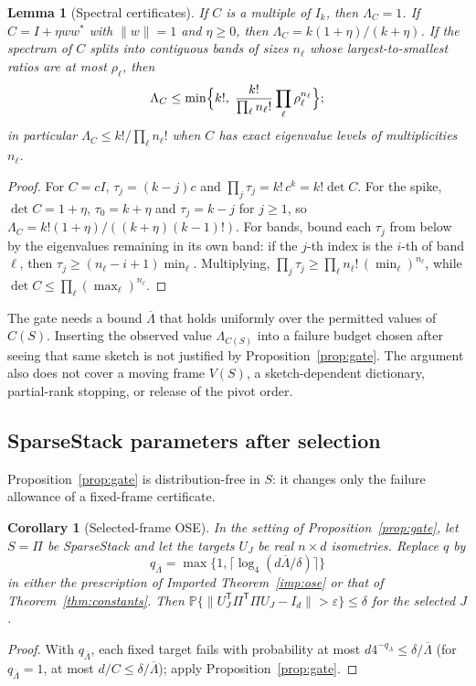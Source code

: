 \documentclass[11pt,a4paper]{article}
\newtheorem{lemma}[theorem]{Lemma}
\newtheorem{corollary}[theorem]{Corollary}
\theoremstyle{definition}
\theoremstyle{remark}
\newcommand{\Prob}{\mathbb P}
\newcommand{\eps}{\varepsilon}
\newcommand{\norm}[1]{\lVert#1\rVert}
\newcommand{\1}{\mathbf 1}
\newcommand{\T}{\mathsf T}
\newcommand{\Lbar}{\overline\Lambda}
\begin{document}
\begin{lemma}[Spectral certificates]\label{lem:bands}
If $C$ is a multiple of $I_k$, then $\Lambda_C=1$. If $C=I+\eta ww^*$
with $\norm w=1$ and $\eta\ge0$, then $\Lambda_C=k(1+\eta)/(k+\eta)$. If
the spectrum of $C$ splits into contiguous bands of sizes $n_\ell$ whose
largest-to-smallest ratios are at most $\rho_\ell$, then
\[
 \Lambda_C\le\min\Bigl\{k!,\;\frac{k!}{\prod_\ell n_\ell!}\prod_\ell\rho_\ell^{n_\ell}\Bigr\};
\]
in particular $\Lambda_C\le k!/\prod_\ell n_\ell!$ when $C$ has exact
eigenvalue levels of multiplicities $n_\ell$.
\end{lemma}
\begin{proof}
For $C=cI$, $\tau_j=(k-j)c$ and $\prod_j\tau_j=k!\,c^k=k!\det C$. For the
spike, $\det C=1+\eta$, $\tau_0=k+\eta$ and $\tau_j=k-j$ for $j\ge1$, so
$\Lambda_C=k!(1+\eta)/((k+\eta)(k-1)!)$. For bands, bound each $\tau_j$
from below by the eigenvalues remaining in its own band: if the $j$-th
index is the $i$-th of band $\ell$, then $\tau_j\ge(n_\ell-i+1)\min_\ell$.
Multiplying, $\prod_j\tau_j\ge\prod_\ell n_\ell!\,(\min_\ell)^{n_\ell}$,
while $\det C\le\prod_\ell(\max_\ell)^{n_\ell}$.
\end{proof}

The gate needs a bound $\Lbar$ that holds uniformly over the permitted
values of $C(S)$. Inserting the observed value $\Lambda_{C(S)}$ into a
failure budget chosen after seeing that same sketch is not justified by
Proposition~\ref{prop:gate}. The argument also does not cover a moving
frame $V(S)$, a sketch-dependent dictionary, partial-rank stopping, or
release of the pivot order.

\subsection{SparseStack parameters after selection}
Proposition~\ref{prop:gate} is distribution-free in $S$: it changes only
the failure allowance of a fixed-frame certificate.

\begin{corollary}[Selected-frame OSE]\label{cor:gate-ss}
In the setting of Proposition~\ref{prop:gate}, let $S=\Pi$ be SparseStack
and let the targets $U_J$ be real $n\times d$ isometries. Replace $q$ by
\[
 q_{\Lbar}=\max\{1,\lceil\log_4(d\Lbar/\delta)\rceil\}
\]
in either the prescription of Imported Theorem~\ref{imp:ose} or that of
Theorem~\ref{thm:constants}. Then
$\Prob\{\norm{U_J^\T\Pi^\T\Pi U_J-I_d}>\eps\}\le\delta$ for the selected $J$.
\end{corollary}
\begin{proof}
With $q_{\Lbar}$, each fixed target fails with probability at most
$d4^{-q_{\Lbar}}\le\delta/\Lbar$ (for $q_{\Lbar}=1$, at most
$d/C\le\delta/\Lbar$); apply Proposition~\ref{prop:gate}.
\end{proof}
\end{document}
